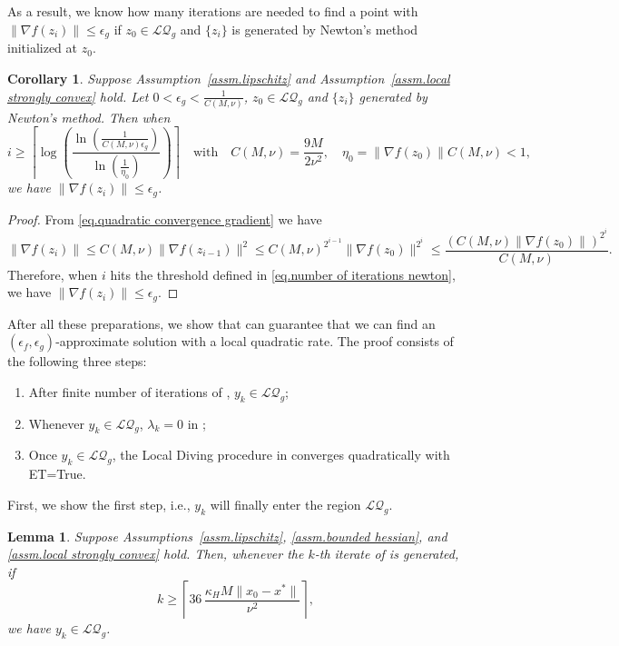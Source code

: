\documentclass{article}
\newtheorem{lemma}[theorem]{Lemma}
\newtheorem{corollary}[theorem]{Corollary}
\numberwithin{equation}{section}
\numberwithin{equation}{section}
\begin{document}
As a result, we know how many iterations are needed to find a point with $\|\nabla f(z_i)\|\leq \epsilon_g$ if $z_0 \in \mathcal{LQ}_g$ and $\{z_i\}$ is generated by Newton's method initialized at $z_0$.
\begin{corollary}
    \label{lem.number of iterations newton}
    Suppose Assumption~\ref{assm.lipschitz} and Assumption~\ref{assm.local strongly convex} hold. Let $0<\epsilon_g< \frac{1}{C(M,\nu)}$, $z_0\in\mathcal{LQ}_g$ and $\{z_i\}$ generated by Newton's method. Then when
    \begin{equation}
        \label{eq.number of iterations newton}
        i\geq \left\lceil \log\left( \frac{\ln\left(\tfrac{1}{C(M,\nu)\epsilon_g}\right)}{\ln\left(\tfrac{1}{\eta_0}\right)} \right) \right\rceil \quad \text{with} \quad C(M,\nu) = \frac{9M}{2\nu^2}, \quad \eta_0 = \|\nabla f(z_0)\| C(M,\nu)<1,
    \end{equation}
    we have $\|\nabla f(z_i)\|\leq \epsilon_g$.
\end{corollary}
\begin{proof}
    From \eqref{eq.quadratic convergence gradient} we have
    \begin{equation*}
        \|\nabla f(z_i)\| \leq C(M,\nu)\|\nabla f(z_{i-1})\|^2 \leq C(M,\nu)^{2^{i-1}} \|\nabla f(z_0)\|^{2^i} \leq \frac{(C(M,\nu)\|\nabla f(z_0)\|)^{2^i}}{C(M,\nu)}.
    \end{equation*}
    Therefore, when $i$ hits the threshold defined in \eqref{eq.number of iterations newton}, we have $\|\nabla f(z_i)\|\leq \epsilon_g$.
\end{proof}
After all these preparations, we show that  can guarantee that we can find an $(\epsilon_f,\epsilon_g)$-approximate solution with a local quadratic rate. The proof consists of the following three steps:
\begin{enumerate}[label=(\roman*)]
    \item After finite number of iterations of , $y_k\in\mathcal{LQ}_g$;
    \item Whenever $y_k\in\mathcal{LQ}_g$, $\lambda_k=0$ in ;
    \item Once $y_k\in \mathcal{LQ}_g$, the Local Diving procedure in  converges quadratically with ET=True.
\end{enumerate}
First, we show the first step, i.e., $y_k$ will finally enter the region $\mathcal{LQ}_g$.
\begin{lemma}\label{lem.enter region}
    Suppose Assumptions~\ref{assm.lipschitz}, \ref{assm.bounded hessian},
    and \ref{assm.local strongly convex} hold. Then, whenever the $k$-th iterate of
     is generated, if
    \[
        k\geq
        \left\lceil
        36\,\frac{\kappa_H M \|x_0-x^*\|}{\nu^2}
        \right\rceil,
    \]
    we have $y_k\in\mathcal{LQ}_g$.
\end{lemma}
\end{document}
